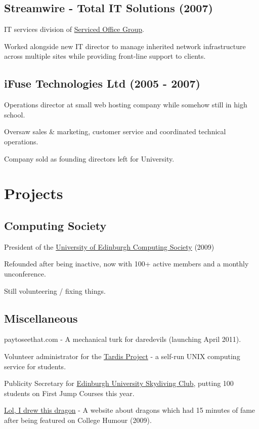 \documentclass[a4paper]{article}
\renewenvironment{itemize}{
  \begin{list}{}{
    \setlength{\leftmargin}{1.5em}
  }
}{
  \end{list}
}
\begin{document}
\subsection*{Streamwire - Total IT Solutions (2007)}
\begin{itemize}
  \item IT services division of \href{http://servicedofficegroup.com}{Serviced Office Group}.
  \item Worked alongside new IT director to manage inherited network infrastructure across multiple sites while providing front-line support to clients.
\end{itemize}

\subsection*{iFuse Technologies Ltd (2005 - 2007)}
\begin{itemize}
  \item Operations director at small web hosting company while somehow still in high school.
  \item Oversaw sales \& marketing, customer service and coordinated technical operations.
  \item Company sold as founding directors left for University.
\end{itemize}

\section*{Projects}

\subsection*{Computing Society}
\begin{itemize}
\item President of the \href{http://comp-soc.com}{University of Edinburgh Computing Society} (2009)
\item Refounded after being inactive, now with 100+ active members and a monthly unconference.
\item Still volunteering / fixing things.
\end{itemize}

\subsection*{Miscellaneous}
\begin{itemize}
\item paytoseethat.com - A mechanical turk for daredevils (launching April 2011).
\item Volunteer administrator for the \href{http://www.tardis.ed.ac.uk/}{Tardis Project} - a self-run UNIX computing service for students.
\item Publicity Secretary for \href{http://facebook.com/getjumped/}{Edinburgh University Skydiving Club}, putting 100 students on First Jump Courses this year.
\item \href{http://lolidrewthisdragon.com}{Lol, I drew this dragon} - A website about dragons which had 15 minutes of fame after being featured on College Humour (2009).
\end{itemize}
\end{document}
